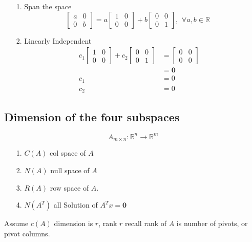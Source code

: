 \documentclass[main.tex]{subfiles}
\begin{document}
\begin{enumerate}
    \item [1.] Span the space
    $$
    \left[\begin{array}{ll}
    a & 0 \\
    0 & b
    \end{array}\right]=a\left[\begin{array}{ll}
    1 & 0 \\
    0 & 0
    \end{array}\right]+b\left[\begin{array}{ll}
    0 & 0 \\
    0 & 1
    \end{array}\right], \begin{array}{r}
    \forall a,b \in \mathbb{R}
    \end{array}
    $$
    
    \item [2.] Linearly Independent
    $$
    \begin{aligned}
    c_{1}\left[\begin{array}{ll}
    1 & 0 \\
    0 & 0
    \end{array}\right]+c_{2}\left[\begin{array}{ll}
    0 & 0 \\
    0 & 1
    \end{array}\right] &=\left[\begin{array}{ll}
    0 & 0 \\
    0 & 0
    \end{array}\right] \\
    &=\bm{0}\\
    c_{1}&=0 \\
    c_{2}&=0
    \end{aligned}
    $$
\end{enumerate}

\subsection{Dimension of the four subspaces}
$$
A_{m \times n}: \mathbb{R}^{n} \rightarrow \mathbb{R}^{m}
$$
\begin{enumerate}
    \item [1.] $C(A)$ col space of $A$ 
    \item [2.] $N(A)$ null space of $A$ 
    \item [3.] $R(A)$ row space of $A$. 
    \item [4.] $N\left(A^{T}\right)$ all Solution of $A^{T} x=\bm{0}$
\end{enumerate}
Assume $c(A)$ dimension is $r$, rank $r$ recall rank of $A$ is number of pivots, or pivot columns.
\end{document}
